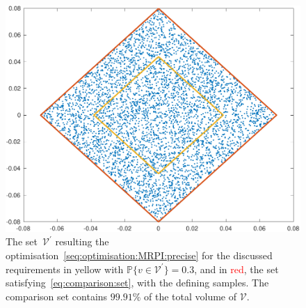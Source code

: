 \documentclass{ifacconf}
\providecommand{\V}{\mathcal V}
\providecommand{\PP}{\mathbb P}
\begin{document}
\begin{figure}
\includegraphics[width=.95\linewidth]{Vprime.pdf}
\caption{The set~$\V^\prime$ resulting the optimisation~\eqref{seq:optimisation:MRPI:precise} for the discussed requirements in \textcolor[rgb]{0.9255,0.6902,0.2078}{yellow} with $\PP\{v\in\V^\prime\}=0.3$, and in \textcolor{red}{red}, the set satisfying~\eqref{eq:comparison:set}, with the defining samples. The comparison set contains $99.91$\% of the total volume of $\V$.}
\label{figure:V:prime:and:comparison}
\vspace{4mm}
\end{figure}
\end{document}
